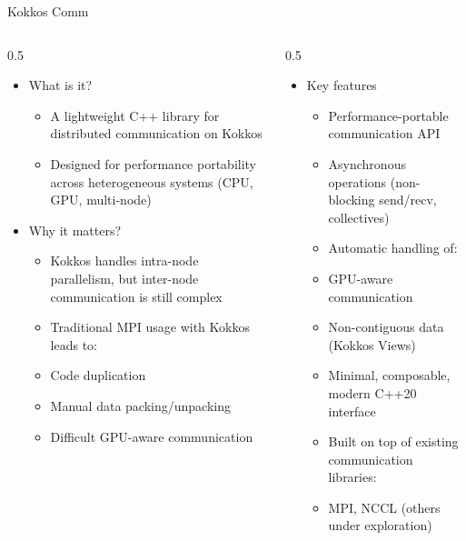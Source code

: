 \documentclass[
    aspectratio=169,
    \createHandout
]{beamer}
\begin{document}
\begin{frame}{Kokkos Comm}
    \begin{columns}
        \begin{column}{0.5\linewidth}
            \begin{itemize}
                \item What is it?
                \begin{itemize}
                    \item A lightweight C++ library for distributed communication on Kokkos
                    \item Designed for performance portability across heterogeneous systems (CPU, GPU, multi-node)
                \end{itemize}
                \item Why it matters?
                \begin{itemize}
                    \item Kokkos handles intra-node parallelism, but inter-node communication is still complex
                    \item Traditional MPI usage with Kokkos leads to:
                    \item Code duplication
                    \item Manual data packing/unpacking
                    \item Difficult GPU-aware communication
                \end{itemize}
            \end{itemize}
        \end{column}
        \begin{column}{0.5\linewidth}
            \begin{itemize}
                \item Key features
                \begin{itemize}
                    \item Performance-portable communication API
                    \item Asynchronous operations (non-blocking send/recv, collectives)
                    \item Automatic handling of:
                    \item GPU-aware communication
                    \item Non-contiguous data (Kokkos Views)
                    \item Minimal, composable, modern C++20 interface
                    \item Built on top of existing 	communication libraries:
                    \item MPI, NCCL (others under exploration)
                \end{itemize}
            \end{itemize}
        \end{column}
    \end{columns}
\end{frame}
\end{document}
